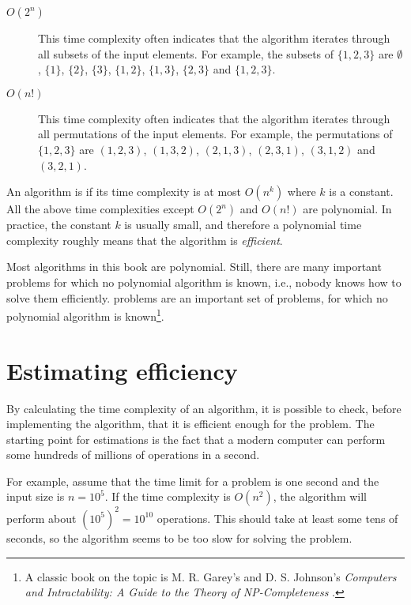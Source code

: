 \begin{description}
\item[$O(2^n)$]
This time complexity often indicates that
the algorithm iterates through all
subsets of the input elements.
For example, the subsets of $\{1,2,3\}$ are
$\emptyset$, $\{1\}$, $\{2\}$, $\{3\}$, $\{1,2\}$,
$\{1,3\}$, $\{2,3\}$ and $\{1,2,3\}$.

\item[$O(n!)$]
This time complexity often indicates that
the algorithm iterates through all
permutations of the input elements.
For example, the permutations of $\{1,2,3\}$ are
$(1,2,3)$, $(1,3,2)$, $(2,1,3)$, $(2,3,1)$,
$(3,1,2)$ and $(3,2,1)$.

\end{description}

An algorithm is 
if its time complexity is at most $O(n^k)$
where $k$ is a constant.
All the above time complexities except
$O(2^n)$ and $O(n!)$ are polynomial.
In practice, the constant $k$ is usually small,
and therefore a polynomial time complexity
roughly means that the algorithm is \emph{efficient}.


Most algorithms in this book are polynomial.
Still, there are many important problems for which
no polynomial algorithm is known, i.e.,
nobody knows how to solve them efficiently.
 problems are an important set
of problems, for which no polynomial algorithm
is known\footnote{A classic book on the topic is
M. R. Garey's and D. S. Johnson's
\emph{Computers and Intractability: A Guide to the Theory
of NP-Completeness} \cite{gar79}.}.

\section{Estimating efficiency}

By calculating the time complexity of an algorithm,
it is possible to check, before
implementing the algorithm, that it is
efficient enough for the problem.
The starting point for estimations is the fact that
a modern computer can perform some hundreds of
millions of operations in a second.

For example, assume that the time limit for
a problem is one second and the input size is $n=10^5$.
If the time complexity is $O(n^2)$,
the algorithm will perform about $(10^5)^2=10^{10}$ operations.
This should take at least some tens of seconds,
so the algorithm seems to be too slow for solving the problem.

